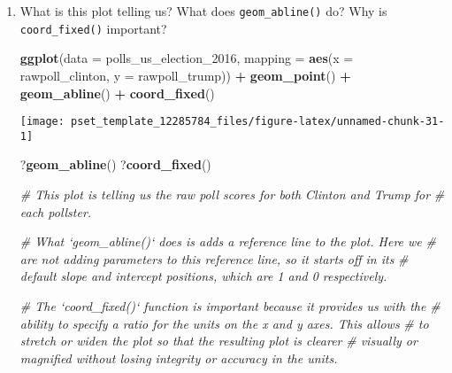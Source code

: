 \documentclass[
]{article}
\newenvironment{Shaded}{\begin{snugshade}}{\end{snugshade}}
\newcommand{\CommentTok}[1]{\textcolor[rgb]{0.56,0.35,0.01}{\textit{#1}}}
\newcommand{\DataTypeTok}[1]{\textcolor[rgb]{0.13,0.29,0.53}{#1}}
\newcommand{\DecValTok}[1]{\textcolor[rgb]{0.00,0.00,0.81}{#1}}
\newcommand{\KeywordTok}[1]{\textcolor[rgb]{0.13,0.29,0.53}{\textbf{#1}}}
\newcommand{\NormalTok}[1]{#1}
\newcommand{\OperatorTok}[1]{\textcolor[rgb]{0.81,0.36,0.00}{\textbf{#1}}}
\newcommand{\StringTok}[1]{\textcolor[rgb]{0.31,0.60,0.02}{#1}}
\begin{document}
\begin{enumerate}
\def\labelenumi{\arabic{enumi}.}
\item
  What is this plot telling us? What does \texttt{geom\_abline()} do?
  Why is \texttt{coord\_fixed()} important?

\begin{Shaded}
\begin{Highlighting}[]
\KeywordTok{ggplot}\NormalTok{(}\DataTypeTok{data =}\NormalTok{ polls_us_election_}\DecValTok{2016}\NormalTok{, }
       \DataTypeTok{mapping =} \KeywordTok{aes}\NormalTok{(}\DataTypeTok{x =}\NormalTok{ rawpoll_clinton, }
                     \DataTypeTok{y =}\NormalTok{ rawpoll_trump)) }\OperatorTok{+}
\StringTok{  }\KeywordTok{geom_point}\NormalTok{() }\OperatorTok{+}\StringTok{ }
\StringTok{  }\KeywordTok{geom_abline}\NormalTok{() }\OperatorTok{+}
\StringTok{  }\KeywordTok{coord_fixed}\NormalTok{()}
\end{Highlighting}
\end{Shaded}

  \texttt{[image: pset\_template\_12285784\_files/figure-latex/unnamed-chunk-31-1]}

\begin{Shaded}
\begin{Highlighting}[]
\NormalTok{?}\KeywordTok{geom_abline}\NormalTok{()}
\NormalTok{?}\KeywordTok{coord_fixed}\NormalTok{()}

\CommentTok{# This plot is telling us the raw poll scores for both Clinton and Trump for}
\CommentTok{# each pollster.}

\CommentTok{# What `geom_abline()` does is adds a reference line to the plot. Here we}
\CommentTok{# are not adding parameters to this reference line, so it starts off in its}
\CommentTok{# default slope and intercept positions, which are 1 and 0 respectively. }

\CommentTok{# The `coord_fixed()` function is important because it provides us with the}
\CommentTok{# ability to specify a ratio for the units on the x and y axes. This allows}
\CommentTok{# to stretch or widen the plot so that the resulting plot is clearer }
\CommentTok{# visually or magnified without losing integrity or accuracy in the units.}
\end{Highlighting}
\end{Shaded}
\end{enumerate}
\end{document}
